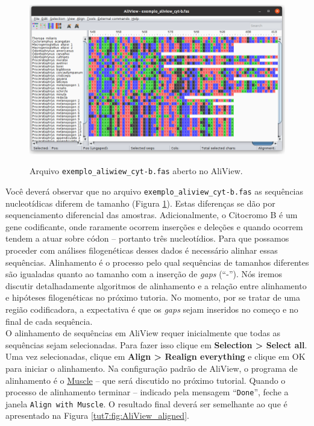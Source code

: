 \begin{refsection}
  \begin{figure}[H]
       \centering
      {\includegraphics[scale=0.4]{figures/tut7/aliview_02.png}}
	{\caption[AliView]{Arquivo \texttt{exemplo\_aliwiew\_cyt-b.fas} aberto no AliView.}\label{tut7:fig:AliView_2}}
  \end{figure}



Você deverá observar que no arquivo \texttt{exemplo\_aliview\_cyt-b.fas} as sequências nucleotídicas diferem de tamanho (Figura \ref{tut7:fig:AliView_2}). Estas diferenças se dão por sequenciamento diferencial das amostras. Adicionalmente, o Citocromo B é um gene codificante, onde raramente ocorrem inserções e deleções e quando ocorrem tendem a atuar sobre códon -- portanto três nucleotídios. Para que possamos proceder com análises filogenéticas desses dados é necessário alinhar essas sequências.  Alinhamento é o processo pelo qual sequências de tamanhos diferentes são igualadas quanto ao tamanho com a inserção de \textit{gaps} (``-''). Nós iremos discutir detalhadamente algoritmos de alinhamento e a relação entre alinhamento e hipóteses filogenéticas no próximo tutoria. No momento, por se tratar de uma região codificadora, a expectativa é que os \textit{gaps} sejam inseridos no começo e no final de cada sequência.\\


O alinhamento de sequências em AliView requer inicialmente que todas as sequências sejam selecionadas. Para fazer isso clique em \textbf{Selection > Select all}. Uma vez selecionadas, clique em \textbf{Align > Realign everything} e clique em OK para iniciar o alinhamento. Na configuração padrão de AliView, o programa de alinhamento é o \href{https://www.ebi.ac.uk/Tools/msa/muscle/}{Muscle} -- que será discutido no próximo tutorial. Quando o processo de alinhamento terminar -- indicado pela mensagem ``\texttt{Done}'', feche a janela \texttt{Align with Muscle}. O resultado final deverá ser semelhante ao que é apresentado na Figura \ref{tut7:fig:AliView_aligned}.



\end{refsection}
